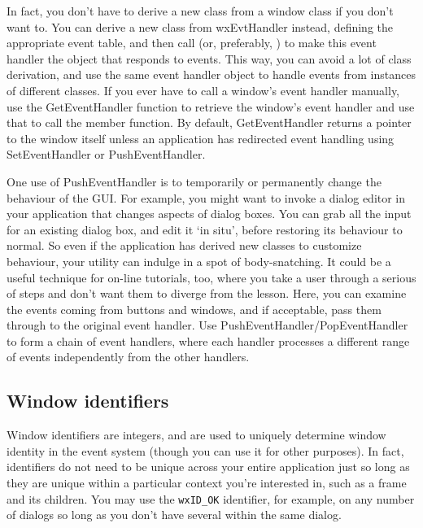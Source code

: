 In fact, you don't have to derive a new class from a window class
if you don't want to. You can derive a new class from wxEvtHandler instead,
defining the appropriate event table, and then call
\rtfsp{} (or, preferably,
\rtfsp{}) to make this
event handler the object that responds to events. This way, you can avoid
a lot of class derivation, and use the same event handler object to
handle events from instances of different classes. If you ever have to call a window's event handler
manually, use the GetEventHandler function to retrieve the window's event handler and use that
to call the member function. By default, GetEventHandler returns a pointer to the window itself
unless an application has redirected event handling using SetEventHandler or PushEventHandler.

One use of PushEventHandler is to temporarily or permanently change the
behaviour of the GUI. For example, you might want to invoke a dialog editor
in your application that changes aspects of dialog boxes. You can
grab all the input for an existing dialog box, and edit it `in situ',
before restoring its behaviour to normal. So even if the application
has derived new classes to customize behaviour, your utility can indulge
in a spot of body-snatching. It could be a useful technique for on-line
tutorials, too, where you take a user through a serious of steps and
don't want them to diverge from the lesson. Here, you can examine the events
coming from buttons and windows, and if acceptable, pass them through to
the original event handler. Use PushEventHandler/PopEventHandler
to form a chain of event handlers, where each handler processes a different
range of events independently from the other handlers.

\subsection{Window identifiers}\label{windowids}

Window identifiers are integers, and are used to
uniquely determine window identity in the event system (though you can use it
for other purposes). In fact, identifiers do not need to be unique
across your entire application just so long as they are unique within a
particular context you're interested in, such as a frame and its children. You
may use the {\tt wxID\_OK} identifier, for example, on any number of dialogs so
long as you don't have several within the same dialog.

